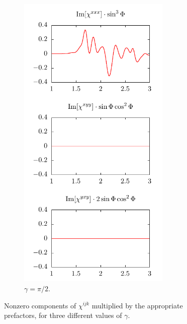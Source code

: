 \documentclass[aps,prb,10pt,letterpaper,notitlepage]{revtex4-1}
\begin{document}
\begin{figure}[b]
\begin{subfigure}[b]{0.25\textwidth}
        \includegraphics[width=0.8\textwidth]{fig03c}
        \caption{$\gamma = \pi/2$.}
    \end{subfigure}
    \caption{Nonzero components of $\chi^{ijk}$ multiplied by the appropriate
    prefactors, for three different values of $\gamma$.}
    \label{fig:comps}
\end{figure}
\end{document}
